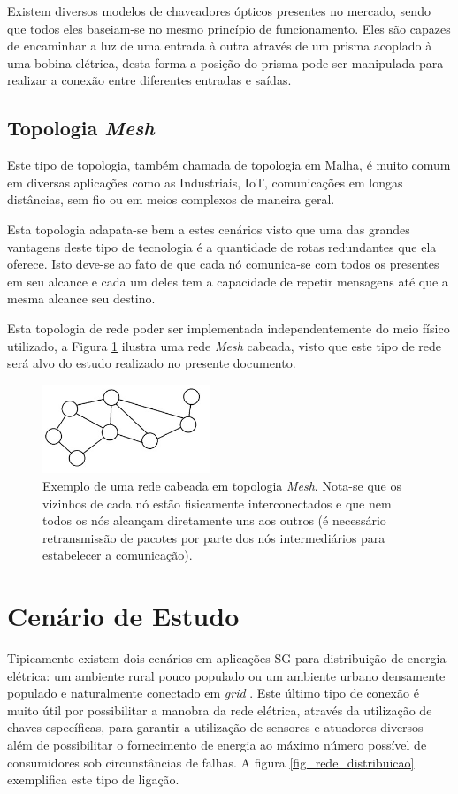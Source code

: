 \documentclass[12pt]{article}
\begin{document}
Existem diversos modelos de chaveadores ópticos presentes no mercado, sendo que todos eles baseiam-se no mesmo princípio de funcionamento. Eles são capazes de encaminhar a luz de uma entrada à outra através de um prisma acoplado à uma bobina elétrica, desta forma a posição do prisma pode ser manipulada para realizar a conexão entre diferentes entradas e saídas.

\subsection{Topologia \emph{Mesh}}
Este tipo de topologia, também chamada de topologia em Malha, é muito comum em diversas aplicações como as Industriais, IoT, comunicações em longas distâncias, sem fio ou em meios complexos de maneira geral. 

Esta topologia adapata-se bem a estes cenários visto que uma das grandes vantagens deste tipo de tecnologia é a quantidade de rotas redundantes que ela oferece. Isto deve-se ao fato de que cada nó comunica-se com todos os presentes em seu alcance e cada um deles tem a capacidade de repetir mensagens até que a mesma alcance seu destino. 

Esta topologia de rede poder ser implementada independentemente do meio físico utilizado, a Figura \ref{fig_rede_mesh} ilustra uma rede \emph{Mesh} cabeada, visto que este tipo de rede será alvo do estudo realizado no presente documento.

\begin{figure}[ht] %
	\centering
	\includegraphics[width=5cm]{Rede_Mesh}
	\caption{Exemplo de uma rede cabeada em topologia \emph{Mesh}. Nota-se que os vizinhos de cada nó estão fisicamente interconectados e que nem todos os nós alcançam diretamente uns aos outros (é necessário retransmissão de pacotes por parte dos nós intermediários para estabelecer a comunicação).}
	\label{fig_rede_mesh}
\end{figure}

\section{Cenário de Estudo}
\label{sec:Ambientacao}
Tipicamente existem dois cenários em aplicações SG para distribuição de energia elétrica: um ambiente rural pouco populado ou um ambiente urbano densamente populado e naturalmente conectado em \emph{grid} \cite{Conf_Sood2009}. Este último tipo de conexão é muito útil por possibilitar a manobra da rede elétrica, através da utilização de chaves específicas, para garantir a utilização de sensores e atuadores diversos além de possibilitar o fornecimento de energia ao máximo número possível de consumidores sob circunstâncias de falhas. A figura \ref{fig_rede_distribuicao} exemplifica este tipo de ligação.
\end{document}
